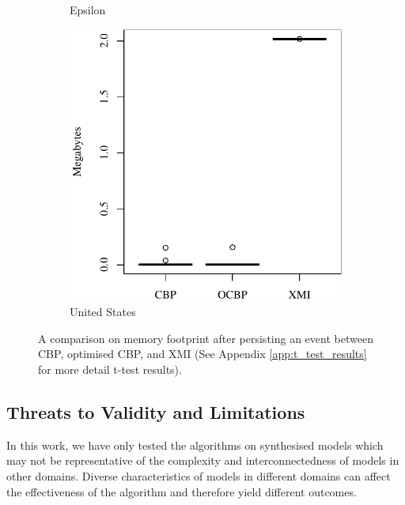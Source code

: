 \documentclass{llncs}
\begin{document}
\begin{figure}[t]
\begin{subfigure}{0.325\textwidth}
            \caption{Epsilon}
            \label{fig:save_memory_epsilon}
        \end{subfigure}
        \hfill
        \begin{subfigure}{0.325\textwidth}
            \centering
            \includegraphics[width=\linewidth]{images/save_memory_wikipedia}
            \caption{United States}
            \label{fig:save_memory_wikipedia}
        \end{subfigure}
        \caption{A comparison on memory footprint after persisting an event between CBP, optimised CBP, and XMI (See Appendix \ref{app:t_test_results} for more detail t-test results).}
        \label{fig:savememory}
    \end{figure}
    
    
    
    \subsection{Threats to Validity and Limitations}
    \label{sec:limitations_and_future_work}
    In this work, we have only tested the algorithms on synthesised  models which may not be representative of the complexity and interconnectedness of models in other domains. Diverse characteristics of models in different domains can affect the effectiveness of the algorithm and therefore yield different outcomes. 
    
\end{document}
